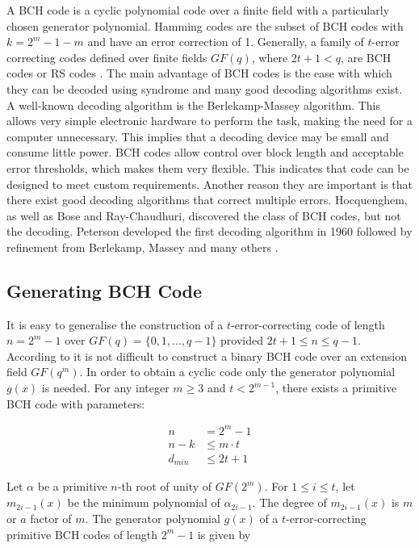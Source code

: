 \documentclass[../main.tex]{subfiles}
\begin{document}
    A BCH code is a cyclic polynomial code over a finite field with a particularly chosen generator polynomial. Hamming codes are the subset of BCH codes with $k=2^m-1-m$ and have an error correction of 1. Generally, a family of $t$-error correcting codes defined over finite fields $GF(q)$, where $2t+1<q$, are BCH codes or RS codes \autocite{hill1986first}. The main advantage of BCH codes is the ease with which they can be decoded using syndrome and many good decoding algorithms exist. A well-known decoding algorithm is the Berlekamp-Massey algorithm. This allows very simple electronic hardware to perform the task, making the need for a computer unnecessary. This implies that a decoding device may be small and consume little power. BCH codes allow control over block length and acceptable error thresholds, which makes them very flexible. This indicates that code can be designed to meet custom requirements. Another reason they are important is that there exist good decoding algorithms that correct multiple errors. Hocquenghem, as well as Bose and Ray-Chaudhuri, discovered the class of BCH codes, but not the decoding. Peterson developed the first decoding algorithm in 1960 followed by refinement from Berlekamp, Massey and many others \autocite{trappe2006introduction}.


    \subsection{Generating BCH Code}

    It is easy to generalise the construction of a $t$-error-correcting code of length $n=2^m-1$ over $GF(q)=\{0, 1, ..., q-1\}$ provided $2t+1 \leq n \leq q-1$. According to \autocite{hill1986first} it is not difficult to construct a binary BCH code over an extension field $GF(q^m)$. In order to obtain a cyclic code only the generator polynomial $g(x)$ is needed. For any integer $m \geq 3$ and $t < 2^{m-1}$, there exists a primitive BCH code with parameters:

    \begin{align*}
              n &= 2^m - 1\\
            n-k &\leq m \cdot t\\
        d_{min} &\leq 2t + 1
    \end{align*}

    Let $\alpha$ be a primitive $n$-th root of unity of $GF(2^m)$. For $1 \leq i \leq t$, let $m_{2i-1}(x)$ be the minimum polynomial of $\alpha_{2i-1}$. The degree of $m_{2i-1}(x)$ is $m$ or $a$ factor of $m$. The generator polynomial $g(x)$ of a $t$-error-correcting primitive BCH codes of length $2^m-1$ is given by
\end{document}
